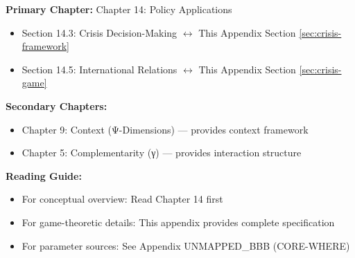 \begin{tcolorbox}[colback=purple!5!white, colframe=purple!75!black,
    title=Chapter Linkage]

\textbf{Primary Chapter:} Chapter 14: Policy Applications
\begin{itemize}[nosep]
\item Section 14.3: Crisis Decision-Making $\leftrightarrow$ This Appendix Section \ref{sec:crisis-framework}
\item Section 14.5: International Relations $\leftrightarrow$ This Appendix Section \ref{sec:crisis-game}
\end{itemize}

\textbf{Secondary Chapters:}
\begin{itemize}[nosep]
\item Chapter 9: Context (Ψ-Dimensions) --- provides context framework
\item Chapter 5: Complementarity (γ) --- provides interaction structure
\end{itemize}

\textbf{Reading Guide:}
\begin{itemize}[nosep]
\item For conceptual overview: Read Chapter 14 first
\item For game-theoretic details: This appendix provides complete specification
\item For parameter sources: See Appendix UNMAPPED_BBB (CORE-WHERE)
\end{itemize}

\end{tcolorbox}


\begin{abstract}
This appendix develops a formal framework for modeling geopolitical crisis escalation using sequential game theory integrated with the EBF context framework. We specify how state actors make decisions under incomplete information, how context dimensions ($\Psi$) modify utility functions and beliefs, and how to derive testable predictions using Subgame Perfect Equilibrium (SPE). The framework is demonstrated through the US-Iran Crisis Model (MOD-GEO-001), showing how behavioral economics enriches traditional international relations theory.
\end{abstract}

